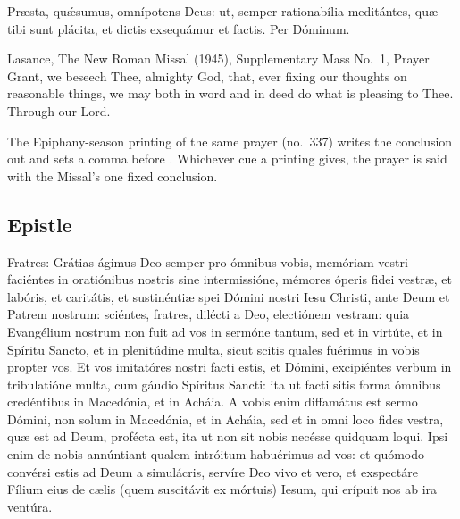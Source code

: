 
\begin{latinproper}
Præsta, quǽsumus, omnípotens Deus: ut, semper rationabília meditántes, quæ
tibi sunt plácita, et dictis exsequámur et factis. Per Dóminum.
\end{latinproper}

\begin{englishwitness}{Lasance, The New Roman Missal (1945), Supplementary Mass No.~1, Prayer}
Grant, we beseech Thee, almighty God, that, ever fixing our thoughts on
reasonable things, we may both in word and in deed do what is pleasing to
Thee. Through our Lord.
\end{englishwitness}

\noindent The Epiphany-season printing of the same prayer (no.~337) writes the
conclusion out and sets a comma before . Whichever cue a
printing gives, the prayer is said with the Missal's one fixed conclusion.

\subsection{Epistle}
\label{proper-epistle}


\begin{latinproper}
Fratres: Grátias ágimus Deo semper pro ómnibus vobis, memóriam vestri
faciéntes in oratiónibus nostris sine intermissióne, mémores óperis fidei
vestræ, et labóris, et caritátis, et sustinéntiæ spei Dómini nostri Iesu
Christi, ante Deum et Patrem nostrum: sciéntes, fratres, dilécti a Deo,
electiónem vestram: quia Evangélium nostrum non fuit ad vos in sermóne
tantum, sed et in virtúte, et in Spíritu Sancto, et in plenitúdine multa,
sicut scitis quales fuérimus in vobis propter vos. Et vos imitatóres nostri
facti estis, et Dómini, excipiéntes verbum in tribulatióne multa, cum gáudio
Spíritus Sancti: ita ut facti sitis forma ómnibus credéntibus in Macedónia,
et in Acháia. A vobis enim diffamátus est sermo Dómini, non solum in
Macedónia, et in Acháia, sed et in omni loco fides vestra, quæ est ad Deum,
profécta est, ita ut non sit nobis necésse quidquam loqui. Ipsi enim de nobis
annúntiant qualem intróitum habuérimus ad vos: et quómodo convérsi estis ad
Deum a simulácris, servíre Deo vivo et vero, et exspectáre Fílium eius de
cælis (quem suscitávit ex mórtuis) Iesum, qui erípuit nos ab ira ventúra.
\end{latinproper}

